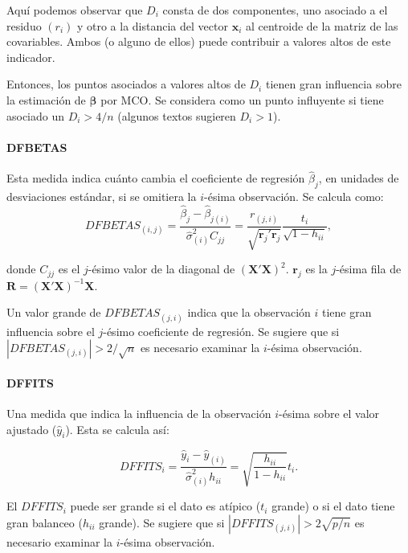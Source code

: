 \documentclass[
]{article}
\begin{document}
Aquí podemos observar que \(D_{i}\) consta de dos componentes, uno asociado a el residuo \((r_{i})\) y otro a la distancia del vector \(\boldsymbol x_{i}\) al centroide de la matriz de las covariables. Ambos (o alguno de ellos) puede contribuir a valores altos de este indicador.

Entonces, los puntos asociados a valores altos de \(D_{i}\) tienen gran influencia sobre la estimación de \(\boldsymbol \beta\) por MCO. Se considera como un punto influyente si tiene asociado un \(D_{i} > 4/n\) (algunos textos sugieren \(D_{i} > 1\)).

\hypertarget{dfbetas}{%
\paragraph{DFBETAS}\label{dfbetas}}

Esta medida indica cuánto cambia el coeficiente de regresión \(\hat{\beta}_{j}\), en unidades de desviaciones estándar, si se omitiera la \(i\)-ésima observación. Se calcula como:
\[
DFBETAS_{(i,j)} = \frac{\hat{\beta}_{j} - \hat{\beta}_{j(i)}}{\hat{\sigma}^{2}_{(i)}C_{jj}} = \frac{r_{(j,i)}}{\sqrt{\boldsymbol r_{j}'\boldsymbol r_{j}}}\frac{t_{i}}{\sqrt{1-h_{ii}}},
\]

donde \(C_{jj}\) es el \(j\)-ésimo valor de la diagonal de \((\boldsymbol X'\boldsymbol X)^{2}\). \(\boldsymbol r_{j}\) es la \(j\)-ésima fila de \(\boldsymbol R=(\boldsymbol X'\boldsymbol X)^{-1}\boldsymbol X\).

Un valor grande de \(DFBETAS_{(j,i)}\) indica que la observación \(i\) tiene gran influencia sobre el \(j\)-ésimo coeficiente de regresión. Se sugiere que si \(|DFBETAS_{(j,i)}| > 2/\sqrt{n}\) es necesario examinar la \(i\)-ésima observación.

\hypertarget{dffits}{%
\paragraph{DFFITS}\label{dffits}}

Una medida que indica la influencia de la observación \(i\)-ésima sobre el valor ajustado (\(\hat{y}_{i}\)). Esta se calcula así:

\[
DFFITS_{i} = \frac{\hat{y}_{i} - \hat{y}_{(i)}}{\hat{\sigma}_{(i)}^{2}h_{ii}} = \sqrt{ \frac{h_{ii}}{1-h_{ii}} }t_{i}.
\]

El \(DFFITS_{i}\) puede ser grande si el dato es atípico (\(t_{i}\) grande) o si el dato tiene gran balanceo (\(h_{ii}\) grande). Se sugiere que si \(|DFFITS_{(j,i)}| > 2\sqrt{p/n}\) es necesario examinar la \(i\)-ésima observación.
\end{document}
